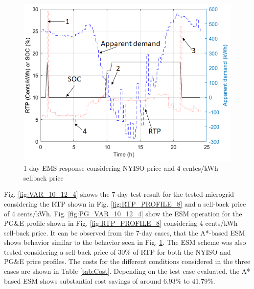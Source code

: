  \begin{figure}[!ht]
    \centering
    \includegraphics[width = \linewidth]{figs/A8/VAR_1_day_example.png}
    \caption{1 day EMS response considering NYISO price and 4 centes/kWh sellback price}
    \label{fig:VAR_1_day_example}
\end{figure}

Fig. \ref{fig:VAR_10_12_4} shows the 7-day test result for the tested microgrid considering the RTP shown in Fig. \ref{fig:RTP_PROFILE_8} and a sell-back price of 4 cents/kWh. Fig. \ref{fig:PG_VAR_10_12_4} show the ESM operation for the PG\&E profile shown in Fig. \ref{fig:RTP_PROFILE_8} considering 4 cents/kWh sell-back price. It can be observed from the 7-day cases, that the A*-based ESM shows behavior similar to the behavior seen in  Fig. \ref{fig:VAR_1_day_example}. The ESM scheme was also tested considering a sell-back price of 30\% of RTP for both the NYISO and PG\&E price profiles. The costs for the different conditions considered in the three cases are shown in Table \ref{tab:Cost}. Depending on the test case evaluated, the A* based ESM shows substantial cost savings of around 6.93\% to 41.79\%. 

